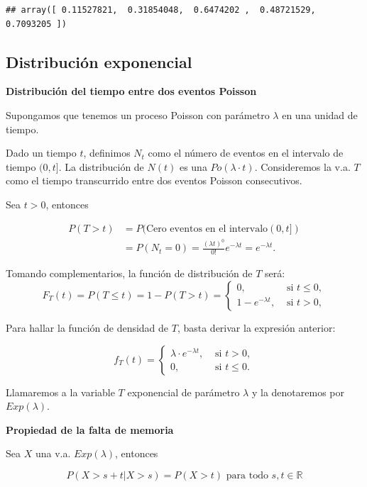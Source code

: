 \documentclass[]{book}
\begin{document}
\begin{verbatim}
## array([ 0.11527821,  0.31854048,  0.6474202 ,  0.48721529,  0.7093205 ])
\end{verbatim}

\hypertarget{distribuciuxf3n-exponencial}{%
\subsection{Distribución exponencial}\label{distribuciuxf3n-exponencial}}

\textbf{Distribución del tiempo entre dos eventos Poisson}

Supongamos que tenemos un proceso Poisson con parámetro \(\lambda\) en una unidad de tiempo.

Dado un tiempo \(t\), definimos \(N_{t}\) como el número de eventos en el intervalo de tiempo \((0,t]\). La distribución de \(N(t)\) es una \(Po(\lambda\cdot t)\). Consideremos la v.a. \(T\) como el tiempo transcurrido entre dos eventos Poisson consecutivos.

Sea \(t>0\), entonces

\[
\begin{array}{rl}
P(T>t)&=P(\mbox{Cero eventos en el intervalo}(0,t])\\
&=P(N_{t}=0)=
         \frac{(\lambda t)^0}{0!} e^{-\lambda
         t}=e^{-\lambda t}.
\end{array}
\]

Tomando complementarios, la función de distribución de \(T\) será:
\[
F_{T}(t)= P(T\leq t)=1-P(T>t)=\left\{\begin{array}{ll} 0, &\mbox{ si } t\leq 0,\\
  1-e^{-\lambda t},& \mbox{ si } t>0,\end{array}\right.
\]

Para hallar la función de densidad de \(T\), basta derivar la expresión anterior:

\[
f_{T}(t)=\left\{\begin{array}{ll}\lambda \cdot e^{-\lambda t}, & \mbox{ si }  t>0,\\
0, & \mbox{ si } t\leq 0. \end{array}\right.
\]

Llamaremos a la variable \(T\) exponencial de parámetro \(\lambda\) y la denotaremos por \(Exp(\lambda)\).

\textbf{Propiedad de la falta de memoria}

Sea \(X\) una v.a. \(Exp(\lambda)\), entonces

\[P(X>s+t\big|X>s)=P(X>t)\mbox{  para todo } s,t\in \mathbb{R}\]
\end{document}
